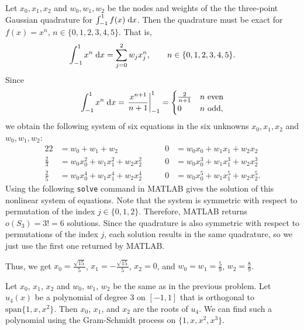 \documentclass{homework}
\begin{document}
	\maketitle
	
	\question
	Let $x_0, x_1, x_2$ and $w_0, w_1, w_2$ be the nodes and weights of the the three-point Gaussian quadrature for $\int_{-1}^1 f(x)\;\text{d} x$. Then the quadrature must be exact for $f(x)= x^n$, $n\in\{0,1,2,3,4,5\}$. That is,
	\begin{equation}
		\int_{-1}^1 x^n \;\text{d} x = \sum_{j=0}^2 w_j x_j^n, \qquad n\in\{0,1,2,3,4,5\}.
	\end{equation}
	Since
	\begin{equation}
		\int_{-1}^1 x^n \;\text{d} x = \left.\frac{x^{n+1}}{n+1}\right\vert_{-1}^1 = \begin{cases}
			\frac{2}{n+1} & n \text{ even} \\
			0 & n \text{ odd},
		\end{cases}
	\end{equation}
	we obtain the following system of six equations in the six unknowns $x_0, x_1, x_2$ and $w_0, w_1, w_2$:
	\begin{alignat*}{2}
		2 &= w_0 + w_1 + w_2 &\qquad 0 & = w_0x_0 + w_1x_1 + w_2x_2 \\[0.3em]
		\frac{2}{3} &= w_0x_0^2 + w_1x_1^2 + w_2x_2^2 &\qquad 0 & = w_0x_0^3 + w_1x_1^3 + w_2x_2^3 \\[0.3em]
		\frac{2}{5} &= w_0x_0^4 + w_1x_1^4 + w_2x_2^4 &\qquad 0 & = w_0x_0^5 + w_1x_1^5 + w_2x_2^5.
	\end{alignat*}
	Using the following \verb*|solve| command in MATLAB gives the solution of this nonlinear system of equations. Note that the system is symmetric with respect to permutation of the index $j \in \{0,1,2\}$. Therefore, MATLAB returns $o(S_3) = 3! = 6$ solutions. Since the quadrature is also symmetric with respect to permutations of the index $j$, each solution results in the same quadrature, so we just use the first one returned by MATLAB.
	
	
	Thus, we get $x_0 = \frac{\sqrt{15}}{5}$, $x_1 = -\frac{\sqrt{15}}{5}$, $x_2 = 0$, and $w_0 = w_1 = \frac{5}{9}$, $w_2 = \frac{8}{9}$.
	
	\question Let $x_0$, $x_1$, $x_2$ and $w_0$, $w_1$, $w_2$ be the same as in the previous problem. Let $u_4(x)$ be a polynomial of degree $3$ on $[-1,1]$ that is orthogonal to $\mathrm{span}\{1, x,x^2\}$. Then $x_0$, $x_1$, and $x_2$ are the roots of $u_4$. We can find such a polynomial using the Gram-Schmidt process on $\{1,x,x^2,x^3\}$.
	
\end{document}
